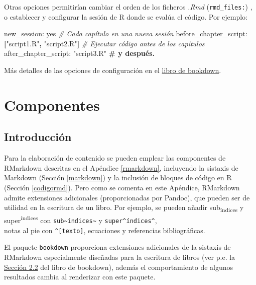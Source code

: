 \documentclass[]{book}
\newenvironment{Shaded}{\begin{snugshade}}{\end{snugshade}}
\newcommand{\KeywordTok}[1]{\textcolor[rgb]{0.13,0.29,0.53}{\textbf{#1}}}
\newcommand{\StringTok}[1]{\textcolor[rgb]{0.31,0.60,0.02}{#1}}
\newcommand{\CommentTok}[1]{\textcolor[rgb]{0.56,0.35,0.01}{\textit{#1}}}
\newcommand{\FunctionTok}[1]{\textcolor[rgb]{0.00,0.00,0.00}{#1}}
\newcommand{\AttributeTok}[1]{\textcolor[rgb]{0.77,0.63,0.00}{#1}}
\newcommand{\ErrorTok}[1]{\textcolor[rgb]{0.64,0.00,0.00}{\textbf{#1}}}
\theoremstyle{definition}
\theoremstyle{definition}
\theoremstyle{definition}
\theoremstyle{remark}
\begin{document}
Otras opciones permitirían cambiar el orden de los ficheros \emph{.Rmd}
(\texttt{rmd\_files:}) , o establecer y configurar la sesión de R donde
se evalúa el código. Por ejemplo:

\begin{Shaded}
\begin{Highlighting}[]
\FunctionTok{new_session:}\AttributeTok{ yes                                    }\CommentTok{# Cada capítulo en una nueva sesión}
\FunctionTok{before_chapter_script:}\AttributeTok{ }\KeywordTok{[}\StringTok{"script1.R"}\KeywordTok{,} \StringTok{"script2.R"}\KeywordTok{]}\AttributeTok{   }\CommentTok{# Ejecutar código antes de los capítulos}
\FunctionTok{after_chapter_script:}\AttributeTok{ }\StringTok{"script3.R"}\ErrorTok{                   # y después.}
\end{Highlighting}
\end{Shaded}

Más detalles de las opciones de configuración en el
\href{https://bookdown.org/yihui/bookdown/configuration.html\#configuration}{libro
de bookdown}.

\chapter{Componentes}\label{componentes}

\section{Introducción}\label{introduccion}

Para la elaboración de contenido se pueden emplear las componentes de
RMarkdown descritas en el Apéndice \ref{rmarkdown}, incluyendo la
sistaxis de Markdown (Sección \ref{markdown}) y la inclusión de bloques
de código en R (Sección \ref{codigormd}). Pero como se comenta en este
Apéndice, RMarkdown admite extensiones adicionales (proporcionadas por
Pandoc), que pueden ser de utilidad en la escritura de un libro. Por
ejemplo, se pueden añadir sub\textsubscript{índices} y
super\textsuperscript{índices} con
\texttt{sub\textasciitilde{}índices\textasciitilde{}} y
\texttt{super\^{}índices\^{}},\\
notas al pie con \texttt{\^{}{[}texto{]}}, ecuaciones y referencias
bibliográficas.

El paquete \texttt{bookdown} proporciona extensiones adicionales de la
sistaxis de RMarkdown especialmente diseñadas para la escritura de
libros (ver p.e. la
\href{https://bookdown.org/yihui/bookdown/markdown-extensions-by-bookdown.html}{Sección
2.2} del libro de bookdown), además el comportamiento de algunos
resultados cambia al renderizar con este paquete.
\end{document}
